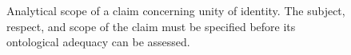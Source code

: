 \begin{figure}[htbp]

    \caption{Analytical scope of a claim concerning unity of identity. The
    subject, respect, and scope of the claim must be specified
    before its ontological adequacy can be assessed.}
    \label{fig:scope-of-unity-of-identity}
\end{figure}

